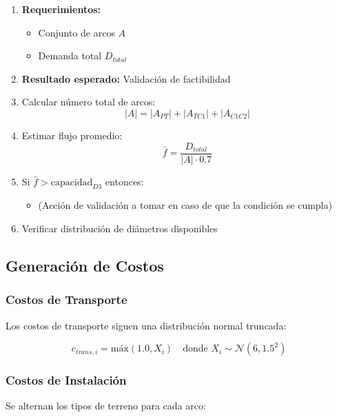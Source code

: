 \documentclass[12pt]{article}
\begin{document}
\begin{enumerate}
    \item \textbf{Requerimientos:}
    \begin{itemize}
        \item Conjunto de arcos $A$
        \item Demanda total $D_{total}$
    \end{itemize}
    
    \item \textbf{Resultado esperado:} Validación de factibilidad
    
    \item Calcular número total de arcos:
    \[
    |A| = |A_{PT}| + |A_{TC1}| + |A_{C1C2}|
    \]
    
    \item Estimar flujo promedio:
    \[
    \bar{f} = \frac{D_{total}}{|A| \cdot 0.7}
    \]
    
    \item Si $\bar{f} > \text{capacidad}_{D3}$ entonces:
    \begin{itemize}
        \item (Acción de validación a tomar en caso de que la condición se cumpla)
    \end{itemize}
    
    \item Verificar distribución de diámetros disponibles
\end{enumerate}


\subsection{Generación de Costos}

\subsubsection{Costos de Transporte}
Los costos de transporte siguen una distribución normal truncada:

\begin{equation}
c_{trans,i} = \text{máx}(1.0, X_i) \quad \text{donde } X_i \sim \mathcal{N}(6, 1.5^2)
\end{equation}

\subsubsection{Costos de Instalación}
Se alternan los tipos de terreno para cada arco:
\end{document}
